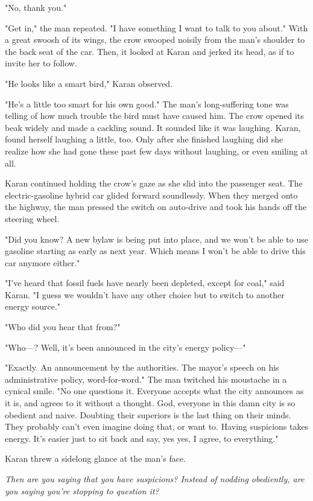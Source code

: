 "No, thank you."

"Get in," the man repeated. "I have something I want to talk to you
about." With a great swoosh of its wings, the crow swooped noisily from
the man's shoulder to the back seat of the car. Then, it looked at Karan
and jerked its head, as if to invite her to follow.

"He looks like a smart bird," Karan observed.

"He's a little too smart for his own good." The man's long-suffering
tone was telling of how much trouble the bird must have caused him. The
crow opened its beak widely and made a cackling sound. It sounded like
it was laughing. Karan, found herself laughing a little, too. Only after
she finished laughing did she realize how she had gone these past few
days without laughing, or even smiling at all.

Karan continued holding the crow's gaze as she slid into the passenger
seat. The electric-gasoline hybrid car glided forward soundlessly. When
they merged onto the highway, the man pressed the switch on auto-drive
and took his hands off the steering wheel.

"Did you know? A new bylaw is being put into place, and we won't be able
to use gasoline starting as early as next year. Which means I won't be
able to drive this car anymore either."

"I've heard that fossil fuels have nearly been depleted, except for
coal," said Karan. "I guess we wouldn't have any other choice but to
switch to another energy source."

"Who did you hear that from?"

"Who---? Well, it's been announced in the city's energy policy---"

"Exactly. An announcement by the authorities. The mayor's speech on his
administrative policy, word-for-word." The man twitched his moustache in
a cynical smile. "No one questions it. Everyone accepts what the city
announces as it is, and agrees to it without a thought. God, everyone in
this damn city is so obedient and naive. Doubting their superiors is the
last thing on their minds. They probably can't even imagine doing that,
or want to. Having suspicions takes energy. It's easier just to sit back
and say, yes yes, I agree, to everything."

Karan threw a sidelong glance at the man's face.

\emph{Then are you saying that you have suspicions? Instead of nodding
obediently, are you saying you're stopping to question it?}

